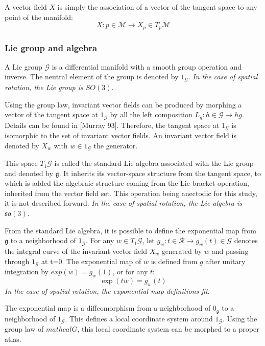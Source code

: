 \documentclass{book}
\begin{document}
A vector field $X$ is simply the association of a vector of the tangent space to any point of the manifold:
\[ X: p \in \mathcal{M} \rightarrow X_p \in T_p \mathcal{M} \]

\subsubsection{Lie group and algebra}

A Lie group $\mathcal{G}$ is a differential manifold with a smooth group operation and inverse.  The neutral element  of the group is denoted by $1_\mathcal{G}$.
\newline\emph{In the case of spatial rotation, the Lie group is $SO(3)$}. \medskip

Using the group law, invariant vector fields can be produced by morphing a vector of the tangent space at $1_\mathcal{G}$ by all the left composition $L_g : h \in \mathcal{G} \rightarrow hg$. Details can be found in [Murray 93]. Therefore, the tangent space at $1_\mathcal{G}$ is isomorphic to the set of invariant vector fields. An invariant vector field is denoted by $X_w$ with $w \in 1_\mathcal{G}$ the generator.

This space $T_1 \mathcal{G}$  is called the standard Lie algebra associated with the Lie group and denoted by $\mathfrak{g}$. It inherits its vector-space structure from the tangent space, to which is added the algebraic structure coming from the Lie bracket operation, inherited from the vector field set. This operation being anectodic for this study, it is not described forward.
\newline\emph{In the case of spatial rotation, the Lie algebra is $\mathfrak{so}(3)$}. \medskip

From the standard Lie algebra, it is possible to define the exponential map from $\mathfrak{g}$ to a neighborhood of $1_\mathcal{G}$.  For any $w \in T_1 \mathcal{G}$, let $g_w: t \in \mathcal{R} \rightarrow g_w(t) \in \mathcal{G}$ denotes the integral curve of the invariant vector field $X_w$ generated by $w$ and passing through $1_\mathcal{G}$ at t=0. The exponential map of $w$ is defined from $g$ after unitary integration by $exp(w) = g_w(1)$, or for any $t$:
\[ \exp(t w) = g_w(t) \]
\emph{In the case of spatial rotation, the exponential map definitions fit}. \medskip

The exponential map is a diffeomorphism from a neighborhood of $0_\mathfrak{g}$ to a neighborhood of $1_\mathcal{G}$. This defines a local coordinate system around $1_\mathcal{G}$. Using the group law of $mathcal{G}$, this local coordinate system can be morphed to a proper atlas.
\end{document}
